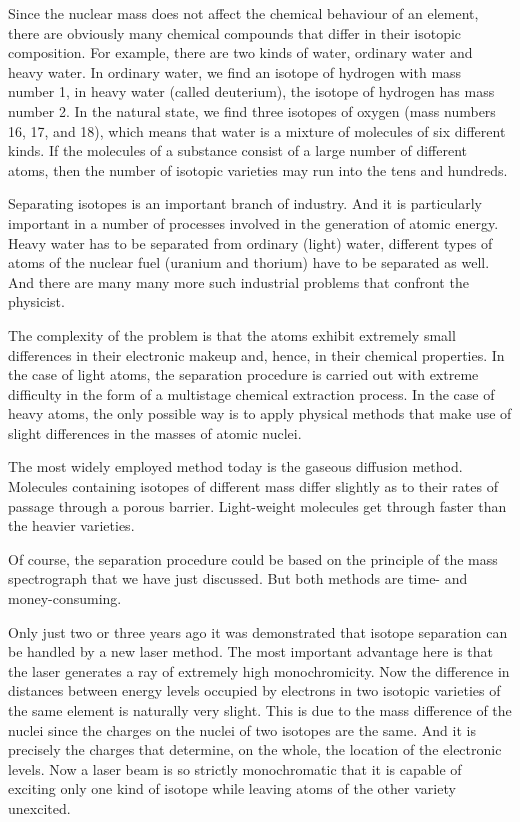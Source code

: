 Since the nuclear mass does not affect the chemical behaviour of an element, there are obviously many chem­ical compounds that differ in their isotopic composition. For example, there are two kinds of water, ordinary water and heavy water. In ordinary water, we find an isotope of hydrogen with mass number 1, in heavy water (called deuterium), the isotope of hydrogen has mass number 2. In the natural state, we find three isotopes of oxygen (mass numbers 16, 17, and 18), which means that water is a mixture of molecules of six different kinds. If the molecules of a substance consist of a large number of different atoms, then the number of isotopic varieties may run into the tens and hundreds.

Separating isotopes is an important branch of industry. And it is particularly important in a number of processes involved in the generation of atomic energy. Heavy water has to be separated from ordinary (light) water, different types of atoms of the nuclear fuel (uranium and thorium) have to be separated as well. And there are many many more such industrial problems that confront the physicist.

The complexity of the problem is that the atoms exhib­it extremely small differences in their electronic makeup and, hence, in their chemical properties. In the case of light atoms, the separation procedure is carried out with extreme difficulty in the form of a multistage chemical extraction process. In the case of heavy atoms, the only possible way is to apply physical methods that make use of slight differences in the masses of atomic nuclei.

The most widely employed method today is the gaseous diffusion method. Molecules containing isotopes of different mass differ slightly as to their rates of passage through a porous barrier. Light-weight molecules get through faster than the heavier varieties.

Of course, the separation procedure could be based on the principle of the mass spectrograph that we have just discussed. But both methods are time- and money-consuming.

Only just two or three years ago it was demonstrated that isotope separation can be handled by a new laser method. The most important advantage here is that the laser generates a ray of extremely high monochromicity. Now the difference in distances between energy levels occupied by electrons in two isotopic varieties of the same element is naturally very slight. This is due to the mass difference of the nuclei since the charges on the nuclei of two isotopes are the same. And it is precisely the charges that determine, on the whole, the location of the electronic levels. Now a laser beam is so strictly monochromatic that it is capable of exciting only one kind of isotope while leaving atoms of the other variety unexcited.


